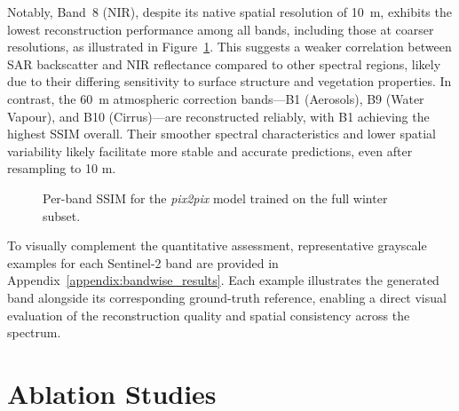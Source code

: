 Notably, Band~8 (NIR), despite its native spatial resolution of 10~m, exhibits the lowest reconstruction performance among all bands, including those at coarser resolutions, as illustrated in Figure~\ref{fig:ssim_per_band}. This suggests a weaker correlation between SAR backscatter and NIR reflectance compared to other spectral regions, likely due to their differing sensitivity to surface structure and vegetation properties. In contrast, the 60~m atmospheric correction bands—B1 (Aerosols), B9 (Water Vapour), and B10 (Cirrus)—are reconstructed reliably, with B1 achieving the highest SSIM overall. Their smoother spectral characteristics and lower spatial variability likely facilitate more stable and accurate predictions, even after resampling to 10 m.

\begin{figure}[h!]
\centering
{}
\caption[Per-band SSIM for the Pix2Pix model]{Per-band SSIM for the \textit{pix2pix} model trained on the full winter subset.}
\label{fig:ssim_per_band}
\end{figure}

To visually complement the quantitative assessment, representative grayscale examples for each Sentinel-2 band are provided in Appendix~\ref{appendix:bandwise_results}. Each example illustrates the generated band alongside its corresponding ground-truth reference, enabling a direct visual evaluation of the reconstruction quality and spatial consistency across the spectrum.

\newpage

\section{Ablation Studies}
